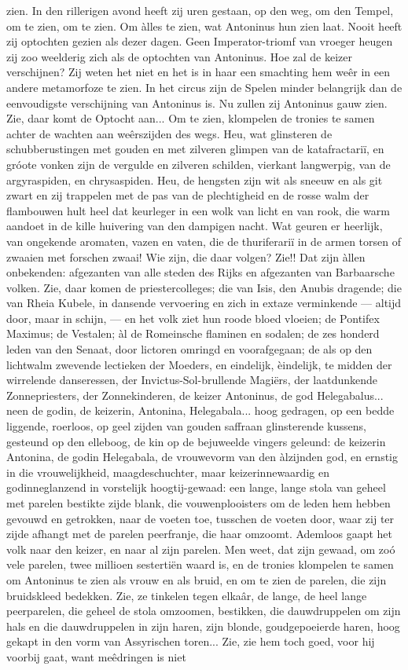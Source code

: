 \documentclass[a4paper, 12pt, oneside, dutch]{article}
\begin{document}
zien. In den rillerigen avond heeft zij uren gestaan, op den weg, om den Tempel, om te zien, om te zien. Om àlles te zien, wat Antoninus hun zien laat. Nooit heeft zij optochten gezien als dezer dagen. Geen Imperator-triomf van vroeger heugen zij zoo weelderig zich als de optochten van Antoninus. Hoe zal de keizer verschijnen? Zij weten het niet en het is in haar een smachting hem weêr in een andere metamorfoze te zien. In het circus zijn de Spelen minder belangrijk dan de eenvoudigste verschijning van Antoninus is. Nu zullen zij Antoninus gauw zien. Zie, daar komt de Optocht aan... Om te zien, klompelen de tronies te samen achter de wachten aan weêrszijden des wegs. Heu, wat glinsteren de schubberustingen met gouden en met zilveren glimpen van de katafractariï, en gróote vonken zijn de vergulde en zilveren schilden, vierkant langwerpig, van de argyraspiden, en chrysaspiden. Heu, de hengsten zijn wit als sneeuw en als git zwart en zij trappelen met de pas van de plechtigheid en de rosse walm der flambouwen hult heel dat keurleger in een wolk van licht en van rook, die warm aandoet in de kille huivering van den dampigen nacht. Wat geuren er heerlijk, van ongekende aromaten, vazen en vaten, die de thuriferariï in de armen torsen of zwaaien met forschen zwaai! Wie zijn, die daar volgen? Zie!! Dat zijn àllen onbekenden: afgezanten van alle steden des Rijks en afgezanten van Barbaarsche volken. Zie, daar komen de priestercolleges; die van Isis, den Anubis dragende; die van Rheia Kubele, in dansende vervoering en zich in extaze verminkende --- altijd door, maar in schijn, --- en het volk ziet hun roode bloed vloeien; de Pontifex Maximus; de Vestalen; àl de Romeinsche flaminen en sodalen; de zes honderd leden van den Senaat, door lictoren omringd en voorafgegaan; de als op den lichtwalm zwevende lectieken der Moeders, en eindelijk, èindelijk, te midden der wirrelende danseressen, der Invictus-Sol-brullende Magiërs, der laatdunkende Zonnepriesters, der Zonnekinderen, de keizer Antoninus, de god Helegabalus... neen de godin, de keizerin, Antonina, Helegabala... hoog gedragen, op een bedde liggende, roerloos, op geel zijden van gouden saffraan glinsterende kussens, gesteund op den elleboog, de kin op de bejuweelde vingers geleund: de keizerin Antonina, de godin Helegabala, de vrouwevorm van den àlzijnden god, en ernstig in die vrouwelijkheid, maagdeschuchter, maar keizerinnewaardig en godinneglanzend in vorstelijk hoogtij-gewaad: een lange, lange stola van geheel met parelen bestikte zijde blank, die vouwenplooisters om de leden hem hebben gevouwd en getrokken, naar de voeten toe, tusschen de voeten door, waar zij ter zijde afhangt met de parelen peerfranje, die haar omzoomt. Ademloos gaapt het volk naar den keizer, en naar al zijn parelen. Men weet, dat zijn gewaad, om zoó vele parelen, twee millioen sestertiën waard is, en de tronies klompelen te samen om Antoninus te zien als vrouw en als bruid, en om te zien de parelen, die zijn bruidskleed bedekken. Zie, ze tinkelen tegen elkaâr, de lange, de heel lange peerparelen, die geheel de stola omzoomen, bestikken, die dauwdruppelen om zijn hals en die dauwdruppelen in zijn haren, zijn blonde, goudgepoeierde haren, hoog gekapt in den vorm van Assyrischen toren... Zie, zie hem toch goed, voor hij voorbij gaat, want meêdringen is niet 
\end{document}
